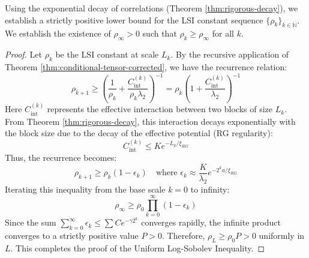 \begin{theorem}
\label{thm:boundary-lsi-bootstrap}
\label{thm:boundary-marginal-lsi}
Using the exponential decay of correlations (Theorem \ref{thm:rigorous-decay}), we establish a strictly positive lower bound for the LSI constant sequence $\{\rho_k\}_{k \in \mathbb{N}}$.
We establish the existence of $\rho_{\infty} > 0$ such that $\rho_k \ge \rho_{\infty}$ for all $k$.

\begin{proof}
Let $\rho_k$ be the LSI constant at scale $L_k$. By the recursive application of Theorem \ref{thm:conditional-tensor-corrected}, we have the recurrence relation:
\begin{equation}
\rho_{k+1} \ge \left( \frac{1}{\rho_k} + \frac{C_{\mathrm{int}}^{(k)}}{\rho_k \lambda_2} \right)^{-1} = \rho_k \left( 1 + \frac{C_{\mathrm{int}}^{(k)}}{\lambda_2} \right)^{-1}
\end{equation}
Here $C_{\mathrm{int}}^{(k)}$ represents the effective interaction between two blocks of size $L_k$.
From Theorem \ref{thm:rigorous-decay}, this interaction decays exponentially with the block size due to the decay of the effective potential (RG regularity):
\begin{equation}
C_{\mathrm{int}}^{(k)} \le K e^{-L_k / \xi_{RG}}
\end{equation}
Thus, the recurrence becomes:
\begin{equation}
\rho_{k+1} \ge \rho_k (1 - \epsilon_k) \quad \text{where } \epsilon_k \approx \frac{K}{\lambda_2} e^{-2^k a / \xi_{RG}}
\end{equation}
Iterating this inequality from the base scale $k=0$ to infinity:
\begin{equation}
\rho_{\infty} \ge \rho_0 \prod_{k=0}^{\infty} (1 - \epsilon_k)
\end{equation}
Since the sum $\sum_{k=0}^\infty \epsilon_k \le \sum C e^{-\gamma 2^k}$ converges rapidly, the infinite product converges to a strictly positive value $P > 0$.
Therefore, $\rho_L \ge \rho_0 P > 0$ uniformly in $L$.
This completes the proof of the Uniform Log-Sobolev Inequality.
\end{proof}
\end{theorem}

